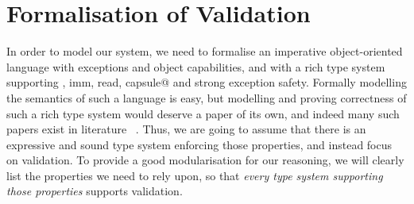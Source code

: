 \saveSpace
\section{Formalisation of Validation}
\label{s:meaning}
\saveSpace
In order to model our system, we need to formalise an imperative object-oriented language
with exceptions and object capabilities,  and with a rich type system
supporting \Q@mut, imm, read, capsule@ and strong exception safety.
Formally modelling the semantics of such a language is easy, but 
modelling and proving correctness of such a rich type system would deserve a paper
of its own, and indeed many such papers exist in literature%
~\cite{ServettoEtAl13a,ServettoZucca15,GordonEtAl12,clebsch2015deny,JOT:issue_2011_01/article1}.
Thus, we are going to assume that there is an expressive and sound type system enforcing
those properties, and instead focus on validation.
To provide a good modularisation for our reasoning, 
we will clearly list the properties we need to rely upon, so that \emph{every type
system supporting those properties} supports validation.

